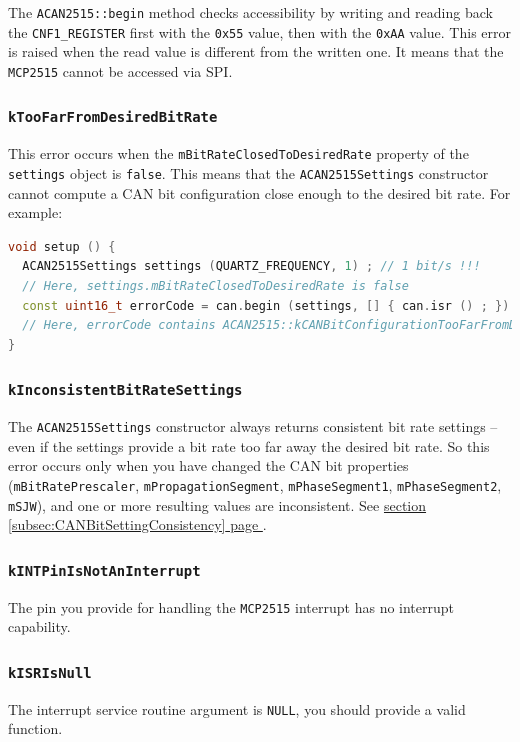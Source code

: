 \documentclass[10pt, a4paper, obeyspaces]{extarticle}
\newcommand\refSubsectionPage[1]{\hyperref[subsec:#1]{section \ref*{subsec:#1} page \pageref{subsec:#1}}}
\newcommand \subsubsectionLabel[2]{\subsubsection{#1}\label{subsubsec:#2}}
\begin{document}
The \texttt{ACAN2515::begin} method checks accessibility by writing and reading back the \texttt{CNF1\_REGISTER} first with the \texttt{0x55} value, then with the \texttt{0xAA} value. This error is raised when the read value is different from the written one. It means that the \texttt{MCP2515} cannot be accessed via SPI. 

\subsubsectionLabel{\texttt{kTooFarFromDesiredBitRate}}{kTooFarFromDesiredBitRate}

This error occurs when the \texttt{mBitRateClosedToDesiredRate} property of the \texttt{settings} object is \texttt{false}. This means that the \texttt{ACAN2515Settings} constructor cannot compute a CAN bit configuration close enough to the desired bit rate. For example:

{ \small\begin{lstlisting}[language=c++]
void setup () {
  ACAN2515Settings settings (QUARTZ_FREQUENCY, 1) ; // 1 bit/s !!!
  // Here, settings.mBitRateClosedToDesiredRate is false
  const uint16_t errorCode = can.begin (settings, [] { can.isr () ; }) ;
  // Here, errorCode contains ACAN2515::kCANBitConfigurationTooFarFromDesiredBitRate
}
\end{lstlisting}}




\subsubsectionLabel{\texttt{kInconsistentBitRateSettings}}{kInconsistentBitRateSettings}

The \texttt{ACAN2515Settings} constructor always returns consistent bit rate settings -- even if the settings provide a bit rate too far away the desired bit rate. So this error occurs only when you have changed the CAN bit properties (\texttt{mBitRatePrescaler}, \texttt{mPropagationSegment}, \texttt{mPhaseSegment1}, \texttt{mPhaseSegment2}, \texttt{mSJW}), and one or more resulting values are inconsistent. See \refSubsectionPage{CANBitSettingConsistency}.











\subsubsectionLabel{\texttt{kINTPinIsNotAnInterrupt}}{kINTPinIsNotAnInterrupt}

The pin you provide for handling the \texttt{MCP2515} interrupt has no interrupt capability.

\subsubsectionLabel{\texttt{kISRIsNull}}{kISRIsNull}

The interrupt service routine argument is \texttt{NULL}, you should provide a valid function.
\end{document}
